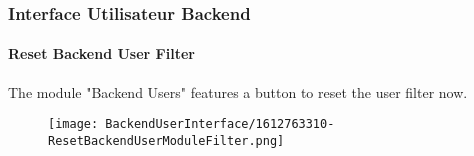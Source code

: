 %

\begin{frame}[fragile]
	\frametitle{Interface Utilisateur Backend}
	\framesubtitle{Reset Backend User Filter}

	The module "Backend Users" features a button to reset the user filter now.

	\begin{figure}
		\texttt{[image: BackendUserInterface/1612763310-ResetBackendUserModuleFilter.png]}
	\end{figure}

\end{frame}

